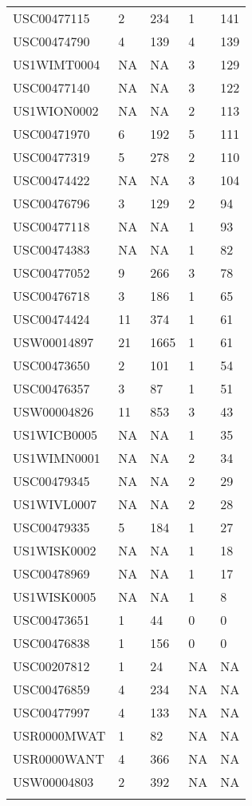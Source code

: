 \begin{longtable}{l l l l l}
				  USC00477115 &   2 & 234 &   1 & 141 \\ 
				  USC00474790 &   4 & 139 &   4 & 139 \\ 
				  US1WIMT0004 & NA & NA &   3 & 129 \\ 
				  USC00477140 & NA & NA &   3 & 122 \\ 
				  US1WION0002 & NA & NA &   2 & 113 \\ 
				  USC00471970 &   6 & 192 &   5 & 111 \\ 
				  USC00477319 &   5 & 278 &   2 & 110 \\ 
				  USC00474422 & NA & NA &   3 & 104 \\ 
				  USC00476796 &   3 & 129 &   2 &  94 \\ 
				  USC00477118 & NA & NA &   1 &  93 \\ 
				  USC00474383 & NA & NA &   1 &  82 \\ 
				  USC00477052 &   9 & 266 &   3 &  78 \\ 
				  USC00476718 &   3 & 186 &   1 &  65 \\ 
				  USC00474424 &  11 & 374 &   1 &  61 \\ 
				  USW00014897 &  21 & 1665 &   1 &  61 \\ 
				  USC00473650 &   2 & 101 &   1 &  54 \\ 
				  USC00476357 &   3 &  87 &   1 &  51 \\ 
				  USW00004826 &  11 & 853 &   3 &  43 \\ 
				  US1WICB0005 & NA & NA &   1 &  35 \\ 
				  US1WIMN0001 & NA & NA &   2 &  34 \\ 
				  USC00479345 & NA & NA &   2 &  29 \\ 
				  US1WIVL0007 & NA & NA &   2 &  28 \\ 
				  USC00479335 &   5 & 184 &   1 &  27 \\ 
				  US1WISK0002 & NA & NA &   1 &  18 \\ 
				  USC00478969 & NA & NA &   1 &  17 \\ 
				  US1WISK0005 & NA & NA &   1 &   8 \\ 
				  USC00473651 &   1 &  44 &   0 &   0 \\ 
				  USC00476838 &   1 & 156 &   0 &   0 \\ 
				  USC00207812 &   1 &  24 & NA & NA \\ 
				  USC00476859 &   4 & 234 & NA & NA \\ 
				  USC00477997 &   4 & 133 & NA & NA \\ 
				  USR0000MWAT &   1 &  82 & NA & NA \\ 
				  USR0000WANT &   4 & 366 & NA & NA \\ 
				  USW00004803 &   2 & 392 & NA & NA \\ 
   \label{tab:climate_stations}

		\end{longtable}
